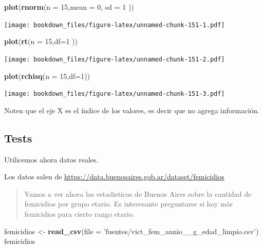 \documentclass[]{book}
\newenvironment{Shaded}{\begin{snugshade}}{\end{snugshade}}
\newcommand{\DataTypeTok}[1]{\textcolor[rgb]{0.13,0.29,0.53}{#1}}
\newcommand{\DecValTok}[1]{\textcolor[rgb]{0.00,0.00,0.81}{#1}}
\newcommand{\KeywordTok}[1]{\textcolor[rgb]{0.13,0.29,0.53}{\textbf{#1}}}
\newcommand{\NormalTok}[1]{#1}
\newcommand{\StringTok}[1]{\textcolor[rgb]{0.31,0.60,0.02}{#1}}
\begin{document}
\begin{Shaded}
\begin{Highlighting}[]
\KeywordTok{plot}\NormalTok{(}\KeywordTok{rnorm}\NormalTok{(}\DataTypeTok{n =} \DecValTok{15}\NormalTok{,}\DataTypeTok{mean =} \DecValTok{0}\NormalTok{, }\DataTypeTok{sd =} \DecValTok{1}\NormalTok{ ))}
\end{Highlighting}
\end{Shaded}

\texttt{[image: bookdown\_files/figure-latex/unnamed-chunk-151-1.pdf]}

\begin{Shaded}
\begin{Highlighting}[]
\KeywordTok{plot}\NormalTok{(}\KeywordTok{rt}\NormalTok{(}\DataTypeTok{n =} \DecValTok{15}\NormalTok{,}\DataTypeTok{df=}\DecValTok{1}\NormalTok{ ))}
\end{Highlighting}
\end{Shaded}

\texttt{[image: bookdown\_files/figure-latex/unnamed-chunk-151-2.pdf]}

\begin{Shaded}
\begin{Highlighting}[]
\KeywordTok{plot}\NormalTok{(}\KeywordTok{rchisq}\NormalTok{(}\DataTypeTok{n =} \DecValTok{15}\NormalTok{,}\DataTypeTok{df=}\DecValTok{1}\NormalTok{))}
\end{Highlighting}
\end{Shaded}

\texttt{[image: bookdown\_files/figure-latex/unnamed-chunk-151-3.pdf]}

Noten que el eje X es el índice de los valores, es decir que no agrega información.

\hypertarget{tests}{%
\subsection{Tests}\label{tests}}

Utilicemos ahora datos reales.

Los datos salen de \url{https://data.buenosaires.gob.ar/dataset/femicidios}

\begin{quote}
Vamos a ver ahora las estadisticas de Buenos Aires sobre la cantidad de femicidios por grupo etario. Es interesante preguntarse si hay más femicidios para cierto rango etario.
\end{quote}

\begin{Shaded}
\begin{Highlighting}[]
\NormalTok{femicidios <-}\StringTok{ }\KeywordTok{read_csv}\NormalTok{(}\DataTypeTok{file =} \StringTok{'fuentes/vict_fem_annio__g_edad_limpio.csv'}\NormalTok{)}
\NormalTok{femicidios}
\end{Highlighting}
\end{Shaded}
\end{document}
